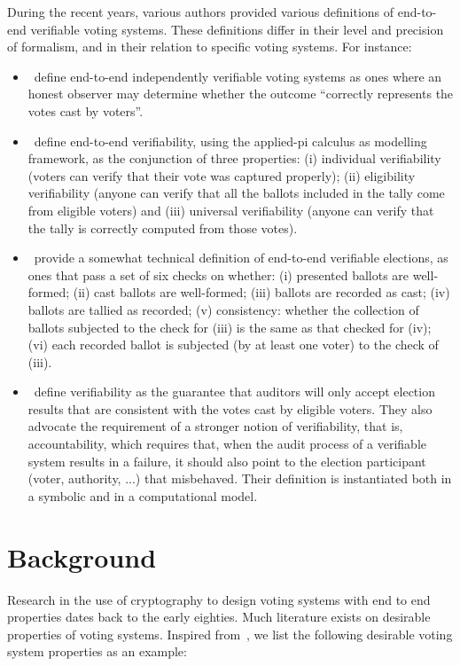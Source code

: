 During the recent years, various authors provided various definitions of
end-to-end verifiable voting systems. These definitions differ in their
level and precision of formalism, and in their relation to  specific voting
systems. For instance:
\begin{itemize}
  \item \cite{lowry2009}~define end-to-end independently verifiable voting
    systems as ones where an honest observer may determine whether the
    outcome ``correctly represents the votes cast by voters''.
  \item \cite{kremer2010}~define end-to-end verifiability, using the
    applied-pi calculus as modelling framework, as the conjunction of three
    properties: (i) individual verifiability (voters can verify that their
    vote was captured properly); (ii) eligibility verifiability (anyone can
    verify that all the ballots included in the tally come from eligible
    voters) and (iii) universal verifiability (anyone can verify that the
    tally is correctly computed from those votes).
  \item \cite{popoveniuc2010performance}~provide a somewhat technical definition of
    end-to-end verifiable elections, as ones that pass a set of six checks
    on whether: (i) presented ballots are well-formed; (ii) cast ballots are
    well-formed; (iii) ballots are recorded as cast; (iv) ballots are
    tallied as recorded; (v) consistency: whether the collection of ballots
    subjected to the check for (iii) is the same as that checked for (iv);
    (vi) each recorded ballot is subjected (by at least one voter) to the
    check of (iii).
  \item \cite{kusters2010}~define verifiability as the guarantee that
    auditors will only accept election results that are consistent with the
    votes cast by eligible voters. They also advocate the requirement of a
    stronger notion of verifiability, that is, accountability, which
    requires that, when the audit process of a verifiable system results in
    a failure, it should also point to the election participant (voter,
    authority, ...) that misbehaved.  Their definition is instantiated both
    in a symbolic and in a computational model.
\end{itemize}

\section{Background}

Research in the use of cryptography to design voting systems with end to end
properties dates back to the early eighties. Much literature exists on
desirable properties of voting systems. Inspired from~\cite{kremer2005}, we
list the following desirable voting system properties as an example:

